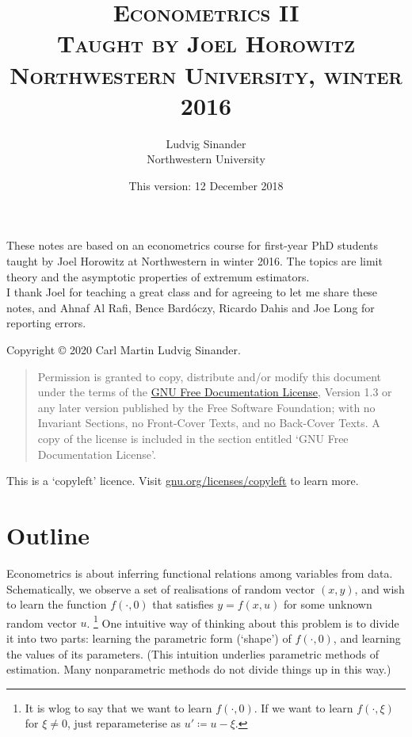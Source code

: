 \documentclass[11pt,letterpaper,reqno,oneside]{article}
\title{\scshape Econometrics II \\
	\vspace{0.5em}
	\large \scshape Taught by Joel Horowitz \\
	\large \scshape Northwestern University, winter 2016
	}
\author{Ludvig Sinander \\ Northwestern University}
\date{\small This version: 12 December 2018}
\begin{document}
\maketitle

\noindent
These notes are based on an econometrics course for first-year PhD students taught by Joel Horowitz at Northwestern in winter 2016. The topics are limit theory and the asymptotic properties of extremum estimators.\\

\noindent
I thank Joel for teaching a great class and for agreeing to let me share these notes, and Ahnaf Al Rafi, Bence Bardóczy, Ricardo Dahis and Joe Long for reporting errors.



\pagebreak
\hspace{1pt}\vfill
\noindent
Copyright \copyright{} 2020 Carl Martin Ludvig Sinander.

\begin{quotation}
\noindent
Permission is granted to copy, distribute and/or modify this document under the terms of the \href{https://www.gnu.org/licenses/fdl}{GNU Free Documentation License}, Version 1.3 or any later version published by the Free Software Foundation; with no Invariant Sections, no Front-Cover Texts, and no Back-Cover Texts. A copy of the license is included in the section entitled `GNU
Free Documentation License'.
\end{quotation}

\noindent
This is a `copyleft' licence.
Visit \href{https://www.gnu.org/licenses/copyleft}{gnu.org/licenses/copyleft} to learn more.



\pagebreak
{}
\tableofcontents
{}



\pagebreak
\section{Outline}
\label{sec:outline}


Econometrics is about inferring functional relations among variables from data. Schematically, we observe a set of realisations of random vector $(x,y)$, and wish to learn the function $f(\cdot,0)$ that satisfies $y=f(x,u)$ for some unknown random vector $u$.%
	\footnote{It is wlog to say that we want to learn $f(\cdot,0)$. If we want to learn $f(\cdot,\xi)$ for $\xi \neq 0$, just reparameterise as $u' \coloneqq u-\xi$.}
One intuitive way of thinking about this problem is to divide it into two parts: learning the parametric form (`shape') of $f(\cdot,0)$, and learning the values of its parameters. (This intuition underlies parametric methods of estimation. Many nonparametric methods do not divide things up in this way.)
\end{document}
